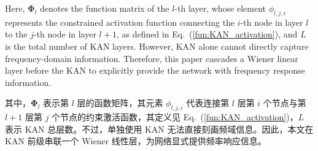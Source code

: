 \documentclass[sn-nature]{sn-jnl}
\newif\ifCNENEnglish
\newif\ifCNENBilingual
\newcommand{\CNEN}[2]{%
    \ifCNENBilingual
        #1%
        \if\relax\detokenize{#2}\relax\else\par #2\fi%
    \else
        \ifCNENEnglish
            #2%
        \else
            #1%
        \fi
    \fi
}
\begin{document}
\CNEN{其中，$\bm{\Phi}_l$ 表示第 $l$ 层的函数矩阵，其元素 $\phi_{l,j,i}$ 代表连接第 $l$ 层第 $i$ 个节点与第 $l+1$ 层第 $j$ 个节点的约束激活函数，其定义见 Eq.~(\ref{fun:KAN_activation})，$L$ 表示 KAN 总层数。不过，单独使用 KAN 无法直接刻画频域信息。因此，本文在 KAN 前级串联一个 Wiener 线性层，为网络显式提供频率响应信息。}{Here, $\bm{\Phi}_l$ denotes the function matrix of the $l$-th layer, whose element $\phi_{l,j,i}$ represents the constrained activation function connecting the $i$-th node in layer $l$ to the $j$-th node in layer $l+1$, as defined in Eq.~(\ref{fun:KAN_activation}), and $L$ is the total number of KAN layers. However, KAN alone cannot directly capture frequency-domain information. Therefore, this paper cascades a Wiener linear layer before the KAN to explicitly provide the network with frequency response information.%
}
\end{document}
